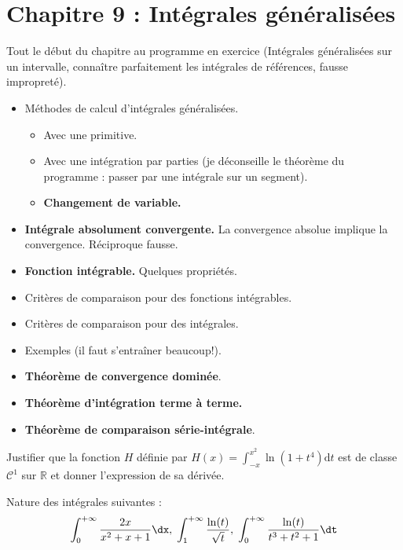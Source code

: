 \documentclass[twoside,a4paper,french,1pt]{VcCours}
\begin{document}
  \section*{Chapitre 9 : Intégrales généralisées}
  Tout le début du chapitre au programme en exercice (Intégrales généralisées sur un intervalle, connaître parfaitement les intégrales de références, fausse impropreté).
  \begin{itemize}
    \item Méthodes de calcul d'intégrales généralisées.
    \begin{itemize}
    \item Avec une primitive.
    \item Avec une intégration par parties (je déconseille le théorème du programme : passer par une intégrale sur un segment).
    \item \textbf{Changement de variable.}
    \end{itemize}
    \item \textbf{Intégrale absolument convergente.} La convergence absolue implique la convergence. Réciproque fausse.
    \item \textbf{Fonction intégrable.} Quelques propriétés.
    \item Critères de comparaison pour des fonctions intégrables.
    \item Critères de comparaison pour des intégrales.
    \item Exemples (il faut s'entraîner beaucoup!).
    \item \textbf{Théorème de convergence dominée}. 
    \item \textbf{Théorème d'intégration terme à terme.}
    \item \textbf{Théorème de comparaison série-intégrale}.
  \end{itemize}  

  \begin{Exercice}
    Justifier que la fonction $H$ définie par $H(x) = \int_{-x}^{x^2} \ln(1+t^4) \text{d}t$ est de classe $\mathcal{C}^1$ sur $\mathbb{R}$ et donner l'expression de sa dérivée.
    \end{Exercice} 

    \begin{Exercice} Nature des intégrales suivantes : 
    $$  \int_{0}^{+ \infty} \frac{2x}{x^2+x+1} \dx, \; \int_{1}^{+ \infty} \frac{\ln(t)}{\sqrt{t}}, \; \int_{0}^{+ \infty} \frac{\ln(t)}{t^3+t^2+1} \dt$$
  \end{Exercice} 
    
\end{document}
